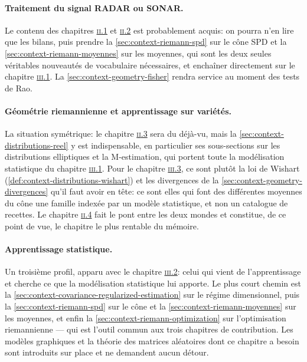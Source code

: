 \paragraph{Traitement du signal RADAR ou SONAR.} Le contenu des chapitres
\hyperref[ch:context-definition]{\textsc{ii}.1} et
\hyperref[ch:context-distributions]{\textsc{ii}.2} est probablement acquis:
on pourra n'en lire que les bilans, puis prendre la
\cref{sec:context-riemann-spd} sur le cône SPD et la
\cref{sec:context-riemann-moyennes} sur les moyennes, qui sont les deux seules
véritables nouveautés de vocabulaire nécessaires, et enchaîner directement sur
le chapitre \hyperref[ch:robust-detection]{\textsc{iii}.1}. La
\cref{sec:context-geometry-fisher} rendra
service au moment des tests de Rao.

\paragraph{Géométrie riemannienne et apprentissage sur variétés.} La situation
symétrique: le chapitre \hyperref[ch:context-riemann]{\textsc{ii}.3} sera du
déjà-vu, mais la
\cref{sec:context-distributions-reel} y est indispensable, en particulier ses
sous-sections sur les distributions elliptiques et la M-estimation, qui portent
toute la modélisation statistique du chapitre
\hyperref[ch:robust-detection]{\textsc{iii}.1}. Pour le chapitre
\hyperref[ch:spdnet]{\textsc{iii}.3}, ce sont plutôt la loi de Wishart
(\cref{def:context-distributions-wishart}) et les divergences de la
\cref{sec:context-geometry-divergences} qu'il faut avoir en tête: ce sont elles
qui font des différentes moyennes du cône une famille indexée par un modèle
statistique, et non un catalogue de recettes. Le chapitre
\hyperref[ch:context-geometry]{\textsc{ii}.4} fait le pont entre les deux mondes et
constitue, de ce point de vue, le chapitre le plus rentable du mémoire.

\paragraph{Apprentissage statistique.} Un troisième profil, apparu avec le
chapitre \hyperref[ch:learning]{\textsc{iii}.2}: celui qui vient de
l'apprentissage et cherche ce que la modélisation statistique lui apporte. Le
plus court chemin est la \cref{sec:context-covariance-regularized-estimation}
sur le régime dimensionnel, puis la \cref{sec:context-riemann-spd} sur le cône
et la \cref{sec:context-riemann-moyennes} sur les moyennes, et enfin la
\cref{sec:context-riemann-optimization} sur l'optimisation riemannienne --- qui
est l'outil commun aux trois chapitres de contribution. Les modèles graphiques
et la théorie des matrices aléatoires dont ce chapitre a besoin sont introduits
sur place et ne demandent aucun détour.

